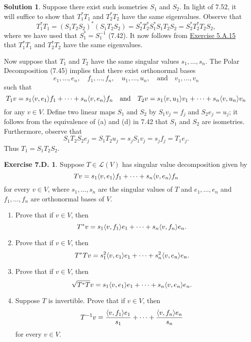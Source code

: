 \documentclass[12pt]{article}
\theoremstyle{definition}
\theoremstyle{exercise}
\newtheorem{exercise}{Exercise 7.D.}
\theoremstyle{solution}
\newtheorem*{solution}{Solution}
\newcommand{\lmap}{\mathcal{L}}
\newcommand{\quand}{\quad \text{and} \quad}
\DeclarePairedDelimiter\ip{\langle}{\rangle}
\begin{document}
\begin{solution}
    Suppose there exist such isometries \( S_1 \) and \( S_2 \). In light of 7.52, it will suffice to show that \( T_1^* T_1 \) and \( T_2^* T_2 \) have the same eigenvalues. Observe that
    \[
        T_1^* T_1 = (S_1 T_2 S_2)^* (S_1 T_2 S_2) = S_2^* T_2^* S_1^* S_1 T_2 S_2 = S_2^* T_2^* T_2 S_2,
    \]
    where we have used that \( S_1^* = S_1^{-1} \) (7.42). It now follows from \href{https://lew98.github.io/Mathematics/LADR_Section_5_A_Exercises.pdf}{Exercise 5.A.15} that \( T_1^* T_1 \) and \( T_2^* T_2 \) have the same eigenvalues.

    Now suppose that \( T_1 \) and \( T_2 \) have the same singular values \( s_1, \ldots, s_n \). The Polar Decomposition (7.45) implies that there exist orthonormal bases
    \[
        e_1, \ldots, e_n, \quad f_1, \ldots, f_n, \quad u_1, \ldots, u_n, \quand v_1, \ldots, v_n
    \]
    such that
    \[
        T_1 v = s_1 \ip{v, e_1} f_1 + \cdots + s_n \ip{v, e_n} f_n \quand T_2 v = s_1 \ip{v, u_1} v_1 + \cdots + s_n \ip{v, u_n} v_n
    \]
    for any \( v \in V \). Define two linear maps \( S_1 \) and \( S_2 \) by \( S_1 v_j = f_j \) and \( S_2 e_j = u_j \); it follows from the equivalence of (a) and (d) in 7.42 that \( S_1 \) and \( S_2 \) are isometries. Furthermore, observe that
    \[
        S_1 T_2 S_2 e_j = S_1 T_2 u_j = s_j S_1 v_j = s_j f_j = T_1 e_j.
    \]
    Thus \( T_1 = S_1 T_2 S_2 \).
\end{solution}

\begin{exercise}
\label{ex:17}
    Suppose \( T \in \lmap(V) \) has singular value decomposition given by
    \[
        Tv = s_1 \ip{v, e_1} f_1 + \cdots + s_n \ip{v, e_n} f_n
    \]
    for every \( v \in V \), where \( s_1, \ldots, s_n \) are the singular values of \( T \) and \( e_1, \ldots, e_n \) and \( f_1, \ldots, f_n \) are orthonormal bases of \( V \).
    \begin{enumerate}
        \item Prove that if \( v \in V \), then
        \[
            T^* v = s_1 \ip{v, f_1} e_1 + \cdots + s_n \ip{v, f_n} e_n.
        \]

        \item Prove that if \( v \in V \), then
        \[
            T^* T v = s_1^2 \ip{v, e_1} e_1 + \cdots + s_n^2 \ip{v, e_n} e_n.
        \]

        \item Prove that if \( v \in V \), then
        \[
            \sqrt{T^* T} v = s_1 \ip{v, e_1} e_1 + \cdots + s_n \ip{v, e_n} e_n.
        \]

        \item Suppose \( T \) is invertible. Prove that if \( v \in V \), then
        \[
            T^{-1} v = \frac{\ip{v, f_1} e_1}{s_1} + \cdots + \frac{\ip{v, f_n} e_n}{s_n}
        \]
        for every \( v \in V \).
    \end{enumerate}
\end{exercise}
\end{document}
